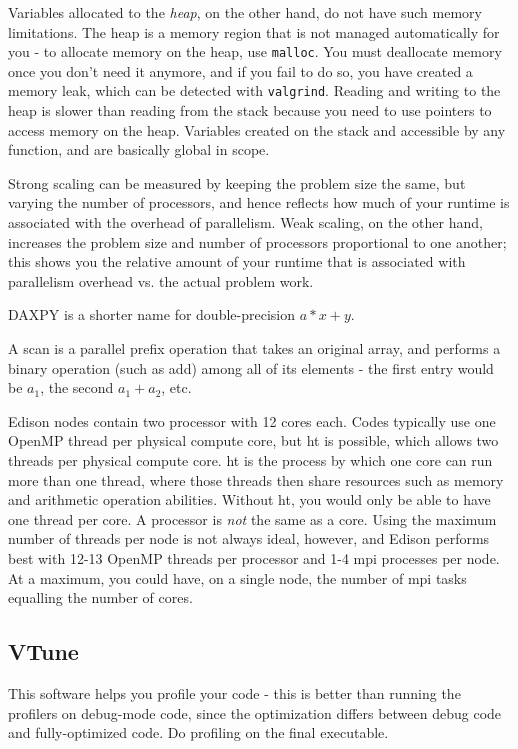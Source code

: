 \documentclass[10pt]{article}
\begin{document}
\begin{flushleft}
Variables allocated to the \textit{heap}, on the other hand, do not have such memory limitations. The heap is a memory region that is not managed automatically for you - to allocate memory on the heap, use {\tt malloc}. You must deallocate memory once you don't need it anymore, and if you fail to do so, you have created a memory leak, which can be detected with {\tt valgrind}. Reading and writing to the heap is slower than reading from the stack because you need to use pointers to access memory on the heap. Variables created on the stack and accessible by any function, and are basically global in scope.

Strong scaling can be measured by keeping the problem size the same, but varying the number of processors, and hence reflects how much of your runtime is associated with the overhead of parallelism. Weak scaling, on the other hand, increases the problem size and number of processors proportional to one another; this shows you the relative amount of your runtime that is associated with parallelism overhead vs. the actual problem work.

DAXPY is a shorter name for double-precision \(a*x+y\). 

A scan is a parallel prefix operation that takes an original array, and performs a binary operation (such as add) among all of its elements - the first entry would be \(a_1\), the second \(a_1+a_2\), etc. 

Edison nodes contain two processor with 12 cores each. Codes typically use one OpenMP thread per physical compute core, but \gls{ht} is possible, which allows two threads per physical compute core. \gls{ht} is the process by which one core can run more than one thread, where those threads then share resources such as memory and arithmetic operation abilities. Without \gls{ht}, you would only be able to have one thread per core. A processor is \textit{not} the same as a core. Using the maximum number of threads per node is not always ideal, however, and Edison performs best with 12-13 OpenMP threads per processor and 1-4 \gls{mpi} processes per node. At a maximum, you could have, on a single node, the number of \gls{mpi} tasks equalling the number of cores.

\subsection{VTune}

This software helps you profile your code - this is better than running the profilers on debug-mode code, since the optimization differs between debug code and fully-optimized code. Do profiling on the final executable.


\end{flushleft}
\end{document}

